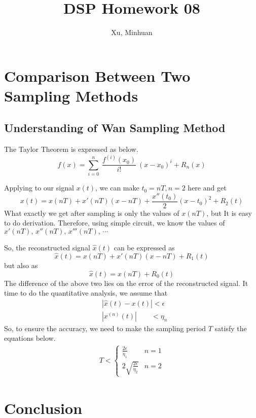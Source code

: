 \documentclass{article}
\begin{document}
\title{DSP Homework 08}
\author{Xu, Minhuan}
\maketitle
\tableofcontents
\begin{abstract}

\end{abstract}


\section{Comparison Between Two Sampling Methods}
\subsection{Understanding of Wan Sampling Method}
The Taylor Theorem is expressed as below.
$$
f(x) = \sum_{i = 0}^{n} ~ \frac{f^{(i)}(x_0)}{i!} ~ (x - x_0)^i + R_n(x)
$$

Applying to our signal $x(t)$, we can make $t_0 = nT, n = 2$ here and get
\begin{equation}
	x(t) = x(nT) + x'(nT)(x - nT) + \frac{x''(t_0)}{2}(x - t_0)^2 + R_2(t)
\end{equation}
What exactly we get after sampling is only the values of $x(nT)$, but It is easy to do derivation. Therefore, using simple circuit, we know the values of $x'(nT),\,x''(nT),\,x'''(nT),\,\cdots$

So, the reconstructed signal $\hat{x}(t)$ can be expressed as
\begin{equation}
	\hat{x}(t) = x(nT) + x'(nT)(x - nT) + R_1(t)
\end{equation}
but also as
\begin{equation}
	\hat{x}(t) = x(nT) + R_0(t)
\end{equation}
The difference of the above two lies on the error of the reconstructed signal. It time to do the quantitative analysis, we assume that
\begin{equation}
	\begin{aligned}
		&|\hat{x}(t) - x(t)| < \epsilon \\
		&|x^{(n)}(t)| \qquad < \eta_n
	\end{aligned}
\end{equation}
So, to ensure the accuracy, we need to make the sampling period $T$ satisfy the equations below.
\begin{align}
	T < \left\{ 
	\begin{array}{lr}
	 	\frac{2\epsilon}{\eta_1} & n = 1 \\
	 	2 \sqrt{\frac{2\epsilon}{\eta_2}} & n = 2
	\end{array} 
	\right.
\end{align}



\section{Conclusion}






\begin{appendices}

\end{appendices}
\end{document}
